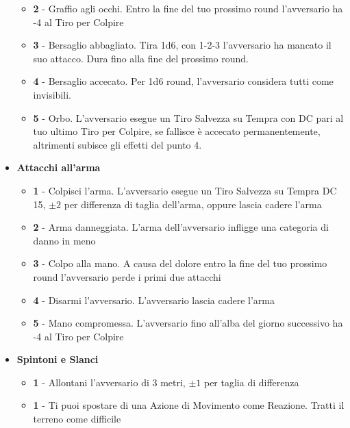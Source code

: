 \begin{multicols}{2}
\begin{itemize}[leftmargin=*]
\begin{itemize}[leftmargin=*]
		\item \textbf{2} - Graffio agli occhi. Entro la fine del tuo prossimo round l'avversario ha -4 al Tiro per Colpire

		\item \textbf{3} - Bersaglio abbagliato. Tira 1d6, con 1-2-3 l'avversario ha mancato il suo attacco. Dura fino alla fine del prossimo round.

		\item \textbf{4} - Bersaglio accecato. Per 1d6 round, l'avversario considera tutti come invisibili.

		\item \textbf{5} - Orbo. L'avversario esegue un Tiro Salvezza su Tempra con DC pari al tuo ultimo Tiro per Colpire, se fallisce è accecato permanentemente, altrimenti subisce gli effetti del punto 4.
	\end{itemize}

	\item \textbf{Attacchi all'arma}
	\begin{itemize}[leftmargin=*]
		\setlength{\itemsep}{0pt}
		\item \textbf{1} - Colpisci l'arma. L'avversario esegue un Tiro Salvezza su Tempra DC 15, $ \pm 2 $ per differenza di taglia dell'arma, oppure lascia cadere l'arma

		\item \textbf{2} - Arma danneggiata. L'arma dell'avversario infligge una categoria di danno in meno

		\item \textbf{3} - Colpo alla mano. A causa del dolore entro la fine del tuo prossimo round l'avversario perde i primi due attacchi

		\item \textbf{4} - Disarmi l'avversario. L'avversario lascia cadere l'arma

		\item \textbf{5} - Mano compromessa. L'avversario fino all'alba del giorno successivo ha -4 al Tiro per Colpire
	\end{itemize}

	\item \textbf{Spintoni e Slanci}
	\begin{itemize}[leftmargin=*]
		\setlength{\itemsep}{0pt}
		\item \textbf{1} - Allontani l'avversario di 3 metri, $ \pm 1$ per taglia di differenza

		\item \textbf{1} - Ti puoi spostare di una Azione di Movimento come Reazione. Tratti il terreno come difficile


\end{itemize}
\end{itemize}
\end{multicols}
